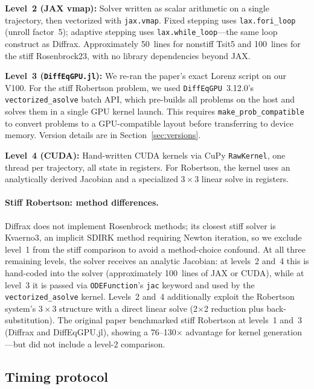 \documentclass[11pt]{article}
\begin{document}
\textbf{Level~2 (JAX vmap):}
Solver written as scalar arithmetic on a single trajectory, then
vectorized with \texttt{jax.vmap}.
Fixed stepping uses \texttt{lax.fori\_loop} (unroll factor~5);
adaptive stepping uses \texttt{lax.while\_loop}---the same loop
construct as Diffrax.
Approximately 50~lines for nonstiff Tsit5 and 100~lines for the
stiff Rosenbrock23, with no library dependencies beyond JAX.

\textbf{Level~3 (\texttt{DiffEqGPU.jl}):}
We re-ran the paper's exact Lorenz script on our V100.
For the stiff Robertson problem, we used
\texttt{DiffEqGPU}~3.12.0's \texttt{vectorized\_asolve} batch
API, which pre-builds all problems on the host and solves them
in a single GPU kernel launch.
This requires \texttt{make\_prob\_compatible} to convert
problems to a GPU-compatible layout before transferring to
device memory.
Version details are in Section~\ref{sec:versions}.

\textbf{Level~4 (CUDA):}
Hand-written CUDA kernels via CuPy \texttt{RawKernel}, one thread
per trajectory, all state in registers.
For Robertson, the kernel uses an analytically derived Jacobian
and a specialized $3 \times 3$ linear solve in registers.

\paragraph{Stiff Robertson: method differences.}
Diffrax does not implement Rosenbrock methods; its closest stiff
solver is Kvaerno3, an implicit SDIRK method requiring Newton
iteration, so we exclude level~1 from the stiff comparison to
avoid a method-choice confound.
At all three remaining levels, the solver receives an analytic
Jacobian: at levels~2 and~4 this is hand-coded into the solver
(approximately 100~lines of JAX or CUDA), while at level~3 it is
passed via \texttt{ODEFunction}'s \texttt{jac} keyword and used by
the \texttt{vectorized\_asolve} kernel.
Levels~2 and~4 additionally exploit the Robertson system's
$3 \times 3$ structure with a direct linear solve (2$\times$2
reduction plus back-substitution).
The original paper benchmarked stiff Robertson at levels~1
and~3 (Diffrax and DiffEqGPU.jl), showing a 76--130$\times$
advantage for kernel generation---but did not include a level-2
comparison.

\subsection{Timing protocol}
\end{document}
